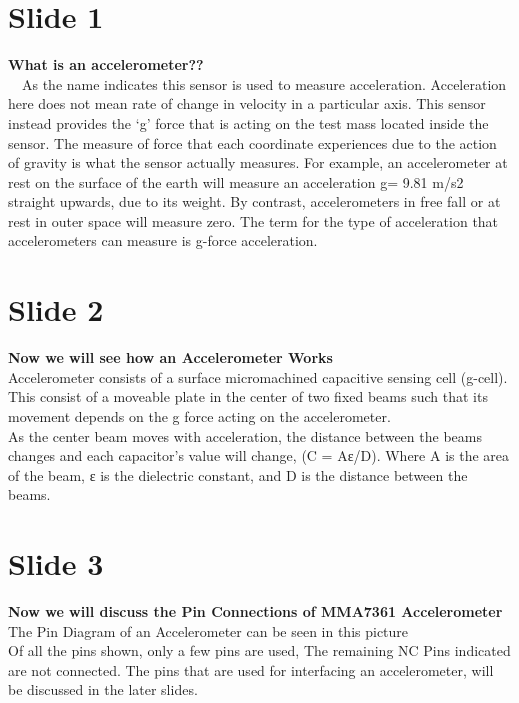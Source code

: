 \documentclass[a4paper,12 pt]{article}
\begin{document}
\section{Slide 1} 


\textbf{What is an accelerometer??}\\
\ \ As the name indicates this sensor is used to measure acceleration. Acceleration here does not mean rate of change in velocity in a particular axis. This sensor instead provides the ‘g’ force that is acting on the test mass located inside the sensor. The measure of force that each coordinate experiences due to the action of gravity is what the sensor actually measures. 
	For example, an accelerometer at rest on the surface of the earth will measure an acceleration g= 9.81 m/s2 straight upwards, due to its weight. By contrast, accelerometers in free fall or at rest in outer space will measure zero. The term for the type of acceleration that accelerometers can measure is g-force acceleration.

\section{Slide 2} 
\textbf{Now we will see how an Accelerometer Works}\\
Accelerometer consists of a surface micromachined capacitive sensing cell (g-cell).\\
This consist of a moveable plate in the center of two fixed beams such that its movement depends on the g force acting on the accelerometer.\\
As the center beam moves with acceleration, the distance between the beams changes and each capacitor's value will change, (C = Aε/D). Where A is the area of the beam, ε is the dielectric constant, and  D is the distance between the beams.


\section{Slide 3} 
\textbf{Now we will discuss the Pin Connections of MMA7361 Accelerometer}\\
The Pin Diagram of an Accelerometer can be seen in this picture\\
Of all the pins shown, only a few pins are used, The  remaining NC Pins indicated are not connected. The pins that are used for interfacing an accelerometer, will be discussed in the later slides.
\end{document}
